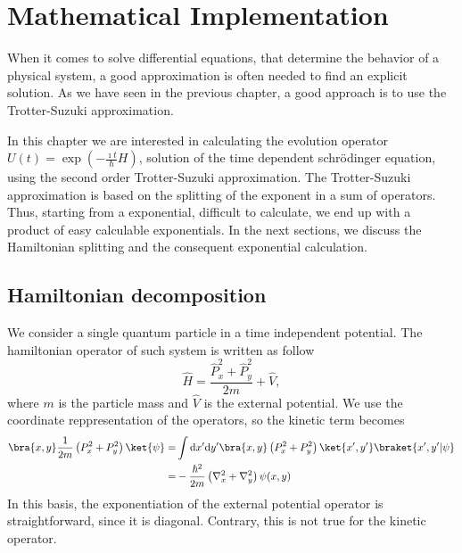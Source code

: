 \chapter{Mathematical Implementation}
When it comes to solve differential equations, that determine the behavior of a physical system, a good approximation is often needed to find an explicit solution. As we have seen in the previous chapter, a good approach is to use the Trotter-Suzuki approximation. 

In this chapter we are interested in calculating the evolution operator $U(t) = \exp \left( - \frac{\imath t}{\hbar} H \right)$, solution of the time dependent schr\"odinger equation, using the second order Trotter-Suzuki approximation. The Trotter-Suzuki approximation is based on the splitting of the exponent in a sum of operators. Thus, starting from a exponential, difficult to calculate, we end up with a product of easy calculable exponentials. In the next sections, we discuss the Hamiltonian splitting and the consequent exponential calculation.

\section{Hamiltonian decomposition}
We consider a single quantum particle in a time independent potential. The hamiltonian operator of such system is written as follow
\begin{equation} \label{eq:hamiltonian-implementation}
\hat{H} = \frac{\hat{P}_x^2 + \hat{P}_y^2}{2m} + \hat{V},
\end{equation}
where $m$ is the particle mass and $\hat{V}$ is the external potential.
We use the coordinate reppresentation of the operators, so the kinetic term becomes
\begin{subequations}
\begin{align}
\bra{x,y} \frac{1}{2m} \left( P_x^2 + P_y^2 \right) \ket{\psi} = & \int \mathrm{d}x' \mathrm{d}y' \bra{x,y} \left( P_x^2 + P_y^2 \right) \ket{x',y'} \braket{x',y'|\psi} \label{eq:tot-momentum1} \\
= & - \frac{\hbar^2}{2m} \left( \nabla_x^2 + \nabla_y^2 \right) \psi(x,y) \label{eq:tot_momentum}
\end{align}
\end{subequations}
In this basis, the exponentiation of the external potential operator is straightforward, since it is diagonal. Contrary, this is not true for the kinetic operator.


